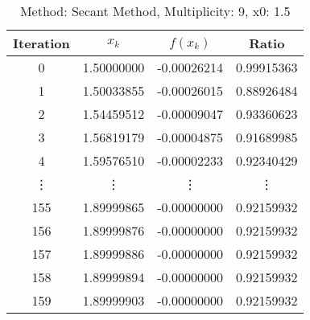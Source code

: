 \begin{table}
\centering
\caption{Method: Secant Method, Multiplicity: 9, x0: 1.5}
\label{tab:table_Secant_Method_9_1_5}
\begin{tabular}{c c c c}
\toprule
Iteration &      $x_k$ &    $f(x_k)$ &      Ratio \\
\midrule
        0 & 1.50000000 & -0.00026214 & 0.99915363 \\
        1 & 1.50033855 & -0.00026015 & 0.88926484 \\
        2 & 1.54459512 & -0.00009047 & 0.93360623 \\
        3 & 1.56819179 & -0.00004875 & 0.91689985 \\
        4 & 1.59576510 & -0.00002233 & 0.92340429 \\
   \vdots &     \vdots &      \vdots &     \vdots \\
      155 & 1.89999865 & -0.00000000 & 0.92159932 \\
      156 & 1.89999876 & -0.00000000 & 0.92159932 \\
      157 & 1.89999886 & -0.00000000 & 0.92159932 \\
      158 & 1.89999894 & -0.00000000 & 0.92159932 \\
      159 & 1.89999903 & -0.00000000 & 0.92159932 \\
\bottomrule
\end{tabular}
\end{table}
